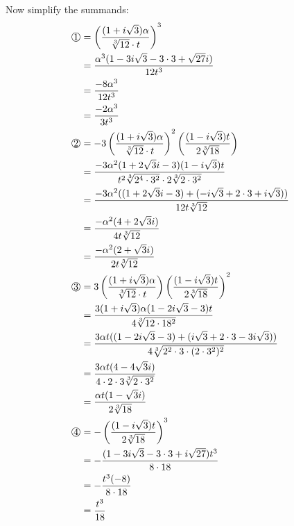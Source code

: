 Now simplify the summands:
\begin{align}
    \raisebox{.5pt}{\textcircled{\raisebox{-.9pt} {1}}} &=
    \left (\frac{(1+i\sqrt{3})\alpha}{\sqrt[3]{12} \cdot t} \right)^3\\
    &= \frac{\alpha^3(1-3i\sqrt{3} - 3 \cdot 3 + \sqrt{27} i)}{12 t^3}\\
    &= \frac{-8\alpha^3}{12 t^3}\\
    &= \frac{-2 \alpha^3}{3 t^3}\\
    \raisebox{.5pt}{\textcircled{\raisebox{-.9pt} {2}}} &=- 3 \left(\frac{(1+i\sqrt{3})\alpha}{\sqrt[3]{12} \cdot t} \right)^2 \left(\frac{(1-i\sqrt{3})t}{2 \sqrt[3]{18}} \right)\\
    &= \frac{-3\alpha^2(1+2\sqrt{3}i-3)(1-i\sqrt{3})t}{t^2 \sqrt[3]{2^4 \cdot 3^2} \cdot 2 \sqrt[3]{2 \cdot 3^2}}\\
    &= \frac{-3\alpha^2((1+2\sqrt{3}i - 3)+(- i\sqrt{3}+2\cdot 3 + i\sqrt{3}))}{12 t \sqrt[3]{12}}\\
    &= \frac{-\alpha^2(4+2\sqrt{3}i)}{4t\sqrt[3]{12}}\\
    &= \frac{-\alpha^2(2+\sqrt{3}i)}{2t\sqrt[3]{12}}\\
    \raisebox{.5pt}{\textcircled{\raisebox{-.9pt} {3}}} &= 3 \left(\frac{(1+i\sqrt{3})\alpha}{\sqrt[3]{12} \cdot t} \right) \left(\frac{(1-i\sqrt{3})t}{2 \sqrt[3]{18}}\right)^2\\
    &= \frac{3(1+i\sqrt{3})\alpha (1-2i\sqrt{3} - 3)t}{4 \sqrt[3]{12 \cdot 18^2}}\\
    &= \frac{3 \alpha t((1-2i\sqrt{3}-3)+(i\sqrt{3} + 2\cdot 3 - 3i\sqrt{3}))}{4 \sqrt[3]{2^2 \cdot 3 \cdot (2 \cdot 3^2)^2}}\\
    &= \frac{3 \alpha t(4-4\sqrt{3}i)}{4 \cdot 2 \cdot 3 \sqrt[3]{2 \cdot 3^2}}\\
    &= \frac{\alpha t(1-\sqrt{3}i)}{2\sqrt[3]{18}}\\
    \raisebox{.5pt}{\textcircled{\raisebox{-.9pt} {4}}} &= - \left(\frac{(1-i\sqrt{3})t}{2 \sqrt[3]{18}}\right)^3\\
    &= -\frac{(1-3i\sqrt{3} - 3 \cdot 3 + i \sqrt{27}) t^3}{8 \cdot 18}\\
    &=- \frac{t^3 (-8)}{8 \cdot 18}\\
    &= \frac{t^3}{18}
\end{align}


